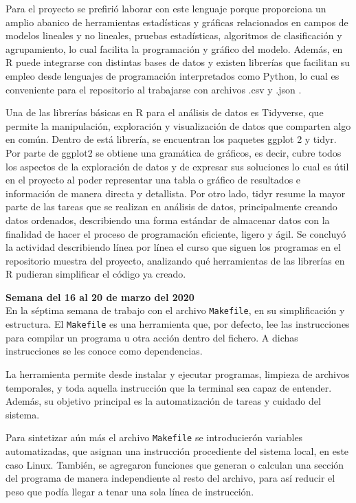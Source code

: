 \documentclass{article}
\begin{document}
    Para el proyecto se prefirió laborar con este lenguaje porque proporciona un amplio abanico de herramientas estadísticas y gráficas relacionados en campos de modelos lineales y no lineales, pruebas estadísticas, algoritmos de clasificación y agrupamiento, lo cual facilita la programación y gráfico del modelo. Además, en R puede integrarse con distintas bases de datos y existen librerías que facilitan su empleo desde lenguajes de programación interpretados como Python, lo cual es conveniente para el repositorio al trabajarse con archivos .csv y .json .

    Una de las librerías básicas en R para el análisis de datos es Tidyverse, que permite la manipulación, exploración y visualización de datos que comparten algo en común. Dentro de está librería, se encuentran los paquetes ggplot 2 y tidyr. Por parte de ggplot2 se obtiene una gramática de gráficos, es decir, cubre todos los aspectos de la exploración de datos y de expresar sus soluciones lo cual es útil en el proyecto al poder representar una tabla o gráfico de resultados e información de manera directa y detallista. Por otro lado, tidyr resume la mayor parte de las tareas que se realizan en análisis de datos, principalmente creando datos ordenados, describiendo una forma estándar de almacenar datos con la finalidad de hacer el proceso de programación eficiente, ligero y ágil.
    Se concluyó la actividad describiendo línea por línea el curso que siguen los programas en el repositorio muestra del proyecto, analizando qué herramientas de las librerías en R pudieran simplificar el código ya creado.

    \textbf{Semana  del 16 al 20 de marzo del 2020} \\
    En la séptima semana de trabajo con el archivo \texttt{Makefile}, en su simplificación y estructura. El \texttt{Makefile} es una herramienta que, por defecto, lee las instrucciones para compilar un programa u otra acción dentro del fichero. A dichas instrucciones se les conoce como dependencias.
    
    La herramienta permite desde instalar y ejecutar programas, limpieza de archivos temporales, y toda aquella instrucción que la terminal sea capaz de entender. Además, su objetivo principal es la automatización de tareas y cuidado del sistema. 
    
    Para sintetizar aún más el archivo \texttt{Makefile} se introducierón variables automatizadas, que asignan una instrucción procediente del sistema local, en este caso Linux. También, se agregaron funciones que generan o calculan una sección del programa de manera independiente al resto del archivo, para así reducir el peso que podía llegar a tenar una sola línea de instrucción.
    
\end{document}

